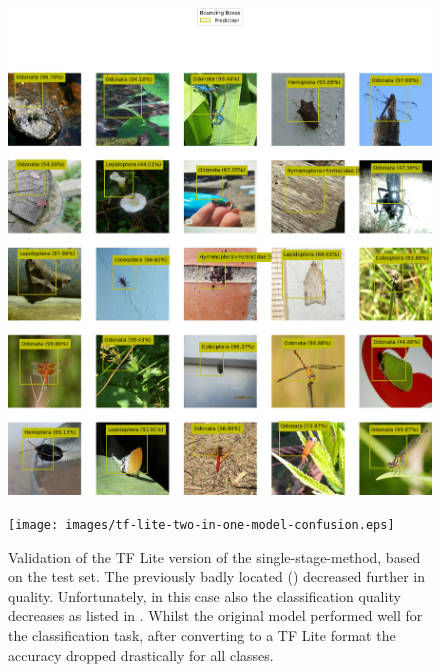 \begin{figure}
    \centering
    \begin{multicols}{2}
        \begin{minipage}{.45\textwidth}
            \includegraphics[width=\textwidth]{images/tf-lite-two-in-one-model-predictions.png}
        \end{minipage}
        \columnbreak
        \begin{minipage}{.45\textwidth}
            \texttt{[image: images/tf-lite-two-in-one-model-confusion.eps]}
        \end{minipage}
    \end{multicols}
    \caption{Validation of the TF Lite version of the single-stage-method, based on the test set. The previously badly located () decreased further in quality. Unfortunately, in this case also the classification quality decreases as listed in . Whilst the original model performed well for the classification task, after converting to a TF Lite format the accuracy dropped drastically for all classes.}
    \label{fig:tflite-single-stage-results}
\end{figure}

